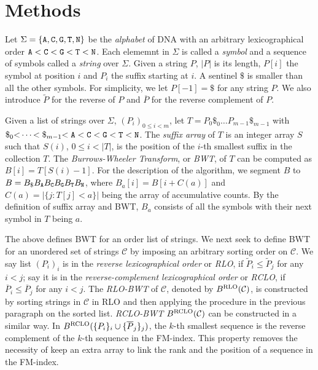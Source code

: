 \documentclass{bioinfo}
\begin{document}
\section{Methods}
\begin{methods}
Let $\Sigma=\{{\tt A},{\tt C},{\tt G},{\tt T},{\tt N}\}$ be the \emph{alphabet}
of DNA with an arbitrary lexicographical order
${\tt A\char60C\char60G\char60T\char60N}$. Each elememnt in $\Sigma$ is
called a \emph{symbol} and a sequence of symbols called a \emph{string} over
$\Sigma$. Given a string $P$, $|P|$ is its length, $P[i]$ the symbol at
position $i$ and $P_i$ the suffix starting at $i$. A sentinel $\$$ is smaller
than all the other symbols. For simplicity, we let $P[-1]=\$$ for any string
$P$. We also introduce $\widetilde{P}$ for the reverse of $P$ and
$\overline{P}$ for the reverse complement of $P$.

Given a list of strings over $\Sigma$, $(P_i)_{0\le i<m}$, let
$T=P_0\$_0\ldots P_{m-1}\$_{m-1}$ with
${\tt\char36}_0{\tt\char60}\cdots{\char60\tt\char36}_{m-1}{\tt\char60A\char60C\char60G\char60T\char60N}$.
The \emph{suffix array} of $T$ is an integer array $S$ such that $S(i)$,
\mbox{$0\le i<|T|$}, is the position of the $i$-th smallest suffix in the
collection $T$.  The \emph{Burrows-Wheeler Transform}, or \emph{BWT}, of $T$
can be computed as \mbox{$B[i]=T[S(i)-1]$}. For the description of the
algorithm, we segment $B$ to \mbox{$B=B_{\tt\$}B_{\tt A}B_{\tt C}B_{\tt
G}B_{\tt T}B_{\tt N}$}, where \mbox{$B_a[i]=B[i+C(a)]$} and
\mbox{$C(a)=|\{j:T[j]<a\}|$} being the array of accumulative counts. By the
definition of suffix array and BWT, $B_a$ consists of all the symbols with
their next symbol in $T$ being $a$.

The above defines BWT for an order list of strings. We next seek to define BWT
for an unordered set of strings $\mathcal{C}$ by imposing an arbitrary sorting
order on $\mathcal{C}$.  We say list $(P_i)_i$ is in the \emph{reverse
lexicographical order} or \emph{RLO}, if $\widetilde{P}_i\le\widetilde{P}_j$
for any $i<j$; say it is in the \emph{reverse-complement lexicographical order}
or \emph{RCLO}, if $\overline{P}_i\le\overline{P}_j$ for any $i<j$.
The \emph{RLO-BWT} of $\mathcal{C}$, denoted by $B^{\rm RLO}(\mathcal{C})$,
is constructed by sorting strings in $\mathcal{C}$ in RLO and then applying
the procedure in the previous paragraph on the sorted list. \emph{RCLO-BWT}
$B^{\rm RCLO}(\mathcal{C})$ can be constructed in a similar way. In
$B^{\rm RCLO}(\{P_i\}_i\cup\{\overline{P}_j\}_j)$, the $k$-th smallest
sequence is the reverse complement of the $k$-th sequence in the FM-index. This
property removes the necessity of keep an extra array to link the rank and
the position of a sequence in the FM-index.


\end{methods}
\end{document}
